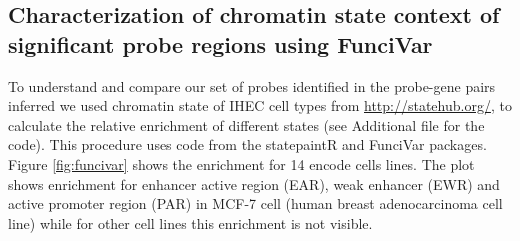 \clearpage

\subsection*{Characterization of chromatin state context of significant probe regions using FunciVar}

To understand and compare our set of probes identified in the probe-gene pairs inferred we used chromatin state of IHEC cell types
from \url{http://statehub.org/}, to calculate the relative enrichment of different states (see Additional file for the code). This procedure uses code from the statepaintR \cite{statepaintr} and FunciVar \cite{funcivar} packages. Figure \ref{fig:funcivar} shows the enrichment for 14 encode cells lines. The plot shows enrichment for enhancer active region (EAR), weak enhancer (EWR) and active promoter region (PAR) in MCF-7 cell (human breast adenocarcinoma cell line) while for other cell lines this enrichment is not visible. 



